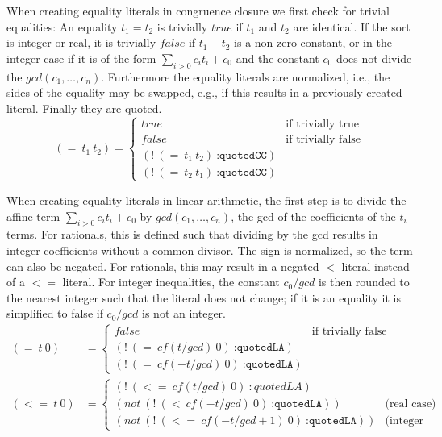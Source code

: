 \documentclass[a4paper]{article}
\newcommand\cf{\mathit{cf}}
\newcommand\annot[2]{(!\ #1\ \texttt{#2})}
\begin{document}
When creating equality literals in congruence closure we first check for
trivial equalities:
An equality $t_1=t_2$ is trivially $true$ if $t_1$ and $t_2$ are identical.
If the sort is integer or real, it is trivially $false$ if $t_1 - t_2$ is
a non zero constant, or in the integer case if it is of the form
$\sum_{i>0} c_i t_i + c_0$ and the constant $c_0$ does not
divide the $gcd(c_1,\dots,c_n)$.
Furthermore the equality literals are normalized, i.e., the sides of the
equality may be swapped, e.g., if this results in a previously created
literal. Finally they are quoted.
\begin{equation}
  (=\ t_1\ t_2) = \begin{cases} true & \text{if trivially true}\\
    false & \text{if trivially false}\\
    \annot{(=\ t_1\ t_2)}{:quotedCC}\\
    \annot{(=\ t_2\ t_1)}{:quotedCC}
  \end{cases}
  \tag{intern}
\end{equation}

When creating equality literals in linear arithmetic, the first step is
to divide the affine term $\sum_{i>0} c_i t_i + c_0$ by $gcd(c_1,\dots,c_n)$, the
gcd of the coefficients of the $t_i$ terms.  For rationals, this is defined such
that dividing by the gcd results in integer coefficients without a common divisor.
The sign is normalized, so the term can also be negated.  For rationals, this
may result in a negated $<$ literal instead of a $<=$ literal.
For integer inequalities, the constant $c_0/gcd$ is then rounded to the nearest
integer such that the literal does not change; if it is an equality it is simplified
to false if $c_0/gcd$ is not an integer.  
\begin{align}
  (=\ t\ 0) &= \begin{cases} false & \text{if trivially false}\\
    \annot{(=\ \cf(t/gcd)\ 0)}{:quotedLA} \\
    \annot{(=\ \cf(-t/gcd)\ 0)}{:quotedLA}
  \end{cases}
  \tag{intern}\\
  (<=\ t\ 0) &= \begin{cases} 
    (!\ (<=\ \cf(t/gcd)\ 0)\ :quotedLA) \\
    (not\ \annot{(<\ \cf(-t/gcd)\ 0)}{:quotedLA}) &\text{(real case)}\\
    (not\ \annot{(<=\ \cf(-t/gcd + 1)\ 0)}{:quotedLA})& \text{(integer case)}
  \end{cases}
  \tag{intern}
\end{align}
\end{document}
